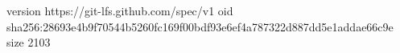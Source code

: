 version https://git-lfs.github.com/spec/v1
oid sha256:28693e4b9f70544b5260fc169f00bdf93e6ef4a787322d887dd5e1addae66c9e
size 2103
